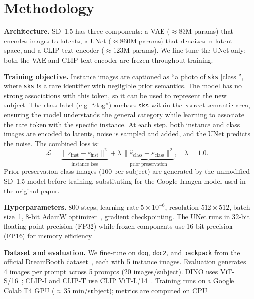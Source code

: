 \documentclass[11pt]{article}
\begin{document}
\section{Methodology}

\textbf{Architecture.} SD~1.5 has three components: a VAE (${\approx}$83M params) that encodes images to latents, a UNet (${\approx}$860M params) that denoises in latent space, and a CLIP text encoder (${\approx}$123M params). We fine-tune the UNet only; both the VAE and CLIP text encoder are frozen throughout training.

\textbf{Training objective.} Instance images are captioned as ``a photo of \texttt{sks} [class]'', where \texttt{sks} is a rare identifier with negligible prior semantics. The model has no strong associations with this token, so it can be used to represent the new subject. The class label (e.g. ``dog'') anchors \texttt{sks} within the correct semantic area, ensuring the model understands the general category while learning to associate the rare token with the specific instance. At each step, both instance and class images are encoded to latents, noise is sampled and added, and the UNet predicts the noise. The combined loss is:
\[
  \mathcal{L} =
  \underbrace{\|\hat{\varepsilon}_\text{inst} - \varepsilon_\text{inst}\|^2}_{\text{instance loss}}
  + \lambda\,
  \underbrace{\|\hat{\varepsilon}_\text{class} - \varepsilon_\text{class}\|^2}_{\text{prior preservation}},
  \quad \lambda = 1.0.
\]
Prior-preservation class images (100 per subject) are generated by the unmodified SD~1.5 model before training, substituting for the Google Imagen model used in the original paper.

\textbf{Hyperparameters.} 800 steps, learning rate $5{\times}10^{-6}$, resolution $512{\times}512$, batch size~1, 8-bit AdamW optimizer~\cite{dettmers2022llm}, gradient checkpointing. The UNet runs in 32-bit floating point precision (FP32) while frozen components use 16-bit precision (FP16) for memory efficiency.

\textbf{Dataset and evaluation.} We fine-tune on \texttt{dog}, \texttt{dog2}, and \texttt{backpack} from the official DreamBooth dataset~\cite{dreambooth_dataset}, each with 5 instance images. Evaluation generates 4 images per prompt across 5 prompts (20 images/subject). DINO uses ViT-S/16~\cite{caron2021dino}; CLIP-I and CLIP-T use CLIP ViT-L/14~\cite{radford2021clip}. Training runs on a Google Colab T4 GPU (${\approx}$35 min/subject); metrics are computed on CPU.
\end{document}
